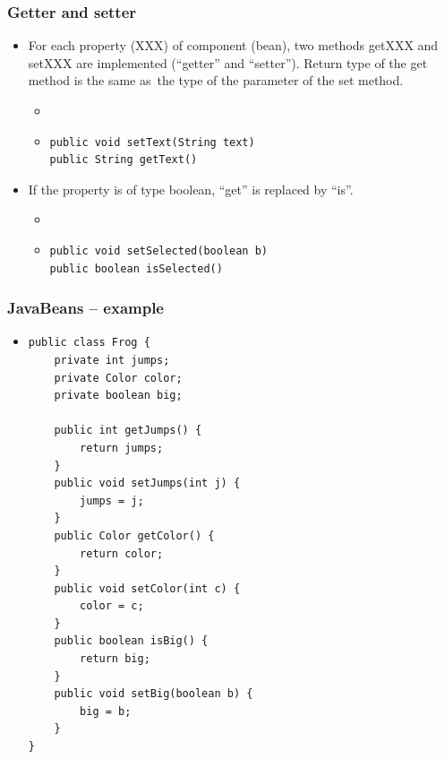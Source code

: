 \documentclass[10pt,xcolor=pdflatex]{beamer}
\begin{document}
\begin{frame}[containsverbatim]\frametitle{Getter and setter}
	\begin{itemize}
    	\item For each property (XXX) of component (bean), two methods getXXX and setXXX are implemented (``getter'' and ``setter''). Return type of the get method is the same as~the type of the parameter of the set method.
	      \begin{itemize}
            \item[] 
    	    \item[] \begin{verbatim}
public void setText(String text)
public String getText()
      \end{verbatim}
          \end{itemize}
    \item If the property is of type boolean, ``get'' is replaced by ``is''.
      \begin{itemize}
        \item[] 
    	\item[] \begin{verbatim}
public void setSelected(boolean b)
public boolean isSelected()
      \end{verbatim}
      \end{itemize}
    \end{itemize}
\end{frame}


\begin{frame}[containsverbatim]\frametitle{JavaBeans -- example}
	\begin{itemize}
    	\item[] \begin{footnotesize} \begin{verbatim}
public class Frog {
    private int jumps;
    private Color color;
    private boolean big;

    public int getJumps() {
        return jumps;
    }
    public void setJumps(int j) {
        jumps = j;
    }
    public Color getColor() {
        return color;
    }
    public void setColor(int c) {
        color = c;
    }
    public boolean isBig() {
        return big;
    }
    public void setBig(boolean b) {
        big = b;
    }
}	
	\end{verbatim}
    \end{footnotesize}
    \end{itemize}
\end{frame}
\end{document}

